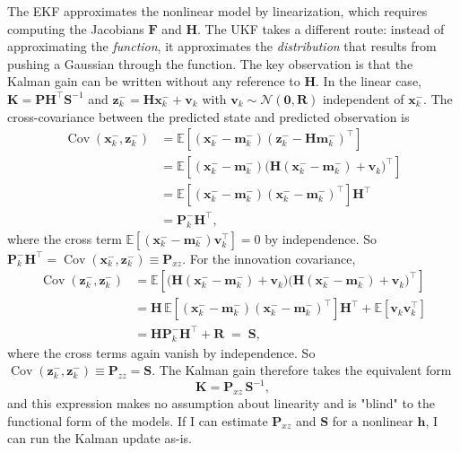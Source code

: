 \documentclass{article}
\DeclareMathOperator{\Cov}{Cov}   %
\begin{document}
The EKF approximates the nonlinear model by linearization, which requires computing the Jacobians $\mathbf{F}$ and $\mathbf{H}$. The UKF takes a different route: instead of approximating the \emph{function}, it approximates the \emph{distribution} that results from pushing a Gaussian through the function. The key observation is that the Kalman gain can be written without any reference to $\mathbf{H}$. In the linear case, $\mathbf{K} = \mathbf{P}\mathbf{H}^\top \mathbf{S}^{-1}$ and $\mathbf{z}_k^- = \mathbf{H}\mathbf{x}_k^- + \mathbf{v}_k$ with $\mathbf{v}_k \sim \mathcal{N}(\mathbf{0}, \mathbf{R})$ independent of $\mathbf{x}_k^-$. The cross-covariance between the predicted state and predicted observation is
\begin{equation}
\begin{split}
  \Cov(\mathbf{x}_k^-, \mathbf{z}_k^-)
  &= \mathbb{E}\!\left[(\mathbf{x}_k^{-} - \mathbf{m}_k^-)(\mathbf{z}_k^{-} - \mathbf{H}\mathbf{m}_k^-)^\top\right] \\
  &= \mathbb{E}\!\left[(\mathbf{x}_k^{-} - \mathbf{m}_k^-)\bigl(\mathbf{H}(\mathbf{x}_k^{-} - \mathbf{m}_k^-) + \mathbf{v}_k\bigr)^\top\right] \\
  &= \mathbb{E}\!\left[(\mathbf{x}_k^{-} - \mathbf{m}_k^-)(\mathbf{x}_k^{-} - \mathbf{m}_k^-)^\top\right]\mathbf{H}^\top \\
  &= \mathbf{P}_k^{-}\mathbf{H}^\top,
\end{split}
\end{equation}
where the cross term $\mathbb{E}[(\mathbf{x}_k^- - \mathbf{m}_k^-)\mathbf{v}_k^\top] = 0$ by independence. So $\mathbf{P}_k^-\mathbf{H}^\top = \Cov(\mathbf{x}_k^-, \mathbf{z}_k^-) \equiv \mathbf{P}_{xz}$. For the innovation covariance,
\begin{equation}
\begin{split}
  \Cov(\mathbf{z}_k^-, \mathbf{z}_k^-)
  &= \mathbb{E}\!\left[\bigl(\mathbf{H}(\mathbf{x}_k^{-} - \mathbf{m}_k^-) + \mathbf{v}_k\bigr)\bigl(\mathbf{H}(\mathbf{x}_k^{-} - \mathbf{m}_k^-) + \mathbf{v}_k\bigr)^\top\right] \\
  &= \mathbf{H}\,\mathbb{E}\!\left[(\mathbf{x}_k^{-} - \mathbf{m}_k^-)(\mathbf{x}_k^{-} - \mathbf{m}_k^-)^\top\right]\mathbf{H}^\top + \mathbb{E}[\mathbf{v}_k\mathbf{v}_k^\top] \\
  &= \mathbf{H}\mathbf{P}_k^{-}\mathbf{H}^\top + \mathbf{R} \;=\; \mathbf{S},
\end{split}
\end{equation}
where the cross terms again vanish by independence. So $\Cov(\mathbf{z}_k^-, \mathbf{z}_k^-) \equiv \mathbf{P}_{zz} = \mathbf{S}$. The Kalman gain therefore takes the equivalent form
\begin{equation}
  \mathbf{K} = \mathbf{P}_{xz}\,\mathbf{S}^{-1},
  \label{eq:kalman-gain-cov}
\end{equation}
and this expression makes no assumption about linearity and is "blind" to the functional form of the models. If I can estimate $\mathbf{P}_{xz}$ and $\mathbf{S}$ for a nonlinear $\mathbf{h}$, I can run the Kalman update as-is.
\end{document}
